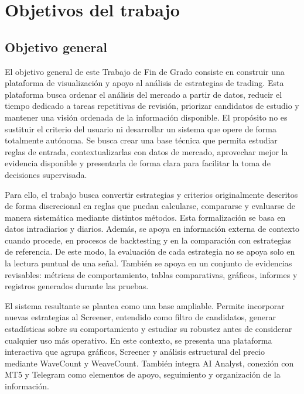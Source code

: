 \section{Objetivos del trabajo}
\label{sec:objetivos-trabajo}

\subsection{Objetivo general}

El objetivo general de este Trabajo de Fin de Grado consiste en construir una
plataforma de visualizaci\'on y apoyo al an\'alisis de estrategias de trading.
Esta plataforma busca ordenar el an\'alisis del mercado a partir de datos,
reducir el tiempo dedicado a tareas repetitivas de revisi\'on, priorizar
candidatos de estudio y mantener una visi\'on
ordenada de la informaci\'on disponible. El prop\'osito no es sustituir el
criterio del usuario ni desarrollar un sistema que opere de forma totalmente
aut\'onoma. Se busca crear una base t\'ecnica que permita estudiar reglas de
entrada, contextualizarlas con datos de mercado, aprovechar mejor la evidencia
disponible y presentarla de forma clara para facilitar la toma de decisiones
supervisada.

Para ello, el trabajo busca convertir estrategias y criterios originalmente
descritos de forma discrecional en reglas que puedan calcularse, compararse y
evaluarse de manera sistem\'atica mediante distintos m\'etodos. Esta
formalizaci\'on se basa en datos intradiarios y diarios. Adem\'as, se apoya en
informaci\'on externa de contexto cuando procede, en procesos de backtesting y
en la comparaci\'on con estrategias de referencia. De este modo, la evaluaci\'on
de cada estrategia no se apoya solo en la lectura puntual de una se\~nal. Tambi\'en
se apoya en un conjunto de evidencias revisables: m\'etricas de comportamiento,
tablas comparativas, gr\'aficos, informes y registros generados durante las pruebas.

El sistema resultante se plantea como una base ampliable. Permite incorporar
nuevas estrategias al Screener, entendido como filtro de candidatos, generar
estad\'isticas sobre su comportamiento y estudiar su robustez antes de considerar
cualquier uso m\'as operativo. En este contexto, se presenta una plataforma
interactiva que agrupa gr\'aficos, Screener y an\'alisis estructural del precio
mediante WaveCount y WeaveCount. Tambi\'en integra AI Analyst, conexi\'on con MT5
y Telegram como elementos de apoyo, seguimiento y organizaci\'on de la informaci\'on.

